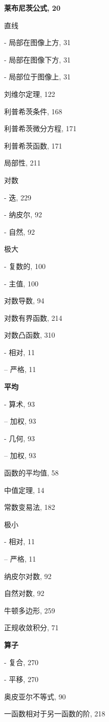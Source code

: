 \par\noindent\textbf{莱布尼茨公式, 20}\par

直线

- 局部在图像上方, 31

- 局部在图像下方, 31

- 局部位于图像上, 31

刘维尔定理, 122

利普希茨条件, 168

利普希茨微分方程, 171

利普希茨函数, 171

局部性, 211

对数

- 迭, 229

- 纳皮尔, 92

- 自然, 92

极大

- 复数的, 100

- 主值, 100

对数导数, 94

对数有界函数, 214

对数凸函数, 310

- 相对, 11

-- 严格, 11

\par\noindent\textbf{平均}\par

- 算术, 93

-- 加权, 93

- 几何, 93

-- 加权, 93

函数的平均值, 58

中值定理, 14

常数变易法, 182

极小

- 相对, 11

-- 严格, 11

纳皮尔对数, 92

自然对数, 92

牛顿多边形, 259

正规收敛积分, 71

\par\noindent\textbf{算子}\par

- 复合, 270

- 平移, 270

奥皮亚尔不等式, 90

一函数相对于另一函数的阶, 218

